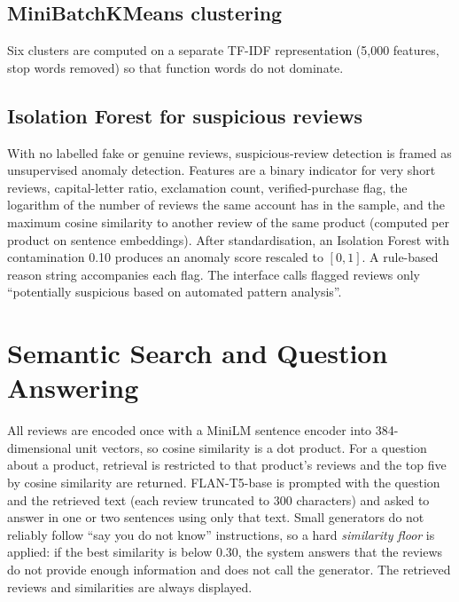 \documentclass[12pt,a4paper]{report}
\begin{document}
\subsection{MiniBatchKMeans clustering}
Six clusters are computed on a separate TF-IDF representation (5,000 features, stop words removed) so that function words do not dominate.
\subsection{Isolation Forest for suspicious reviews}
With no labelled fake or genuine reviews, suspicious-review detection is framed as unsupervised anomaly detection. Features are a binary indicator for very short reviews, capital-letter ratio, exclamation count, verified-purchase flag, the logarithm of the number of reviews the same account has in the sample, and the maximum cosine similarity to another review of the same product (computed per product on sentence embeddings). After standardisation, an Isolation Forest with contamination 0.10 produces an anomaly score rescaled to $[0,1]$. A rule-based reason string accompanies each flag. The interface calls flagged reviews only ``potentially suspicious based on automated pattern analysis''.

\section{Semantic Search and Question Answering}
All reviews are encoded once with a MiniLM sentence encoder into 384-dimensional unit vectors, so cosine similarity is a dot product. For a question about a product, retrieval is restricted to that product's reviews and the top five by cosine similarity are returned. FLAN-T5-base is prompted with the question and the retrieved text (each review truncated to 300 characters) and asked to answer in one or two sentences using only that text. Small generators do not reliably follow ``say you do not know'' instructions, so a hard \emph{similarity floor} is applied: if the best similarity is below 0.30, the system answers that the reviews do not provide enough information and does not call the generator. The retrieved reviews and similarities are always displayed.
\end{document}
